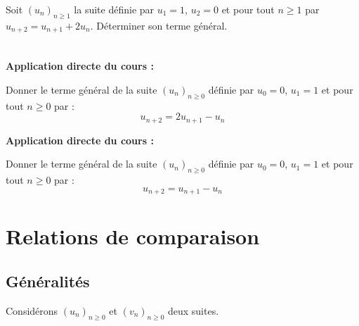 \documentclass[french,11pt,twoside]{VcCours}
\newenvironment{ApplicationDirecte}{\textbf{Application directe du cours :}

}{}
\begin{document}
\begin{Exemple} Soit $(u_n)_{n \geq 1}$ la suite définie par $u_1 = 1$, $u_2 = 0$ et pour tout $n \geq 1$ par $u_{n+2}= u_{n+1} + 2 u_n$. Déterminer son terme général.

%
%
%
%
%

\vspace{11cm}
\end{Exemple}


$\phantom{test}$

\vspace{4cm}

\begin{ApplicationDirecte} Donner le terme général de la suite $(u_n)_{n \geq 0}$ définie par $u_0=0$, $u_1=1$ et pour tout $n \geq 0$ par :  $$u_{n+2} = 2 u_{n+1}-u_n$$
\end{ApplicationDirecte}

\begin{ApplicationDirecte} Donner le terme général de la suite $(u_n)_{n \geq 0}$ définie par $u_0=0$, $u_1=1$ et pour tout $n \geq 0$ par : $$ u_{n+2} =  u_{n+1} - u_n$$ \end{ApplicationDirecte}

\pagebreak
\section{Relations de comparaison}
\subsection{Généralités}
Considérons $(u_n)_{n \geq 0}$ et $(v_n)_{n \geq 0}$ deux suites.
\end{document}
